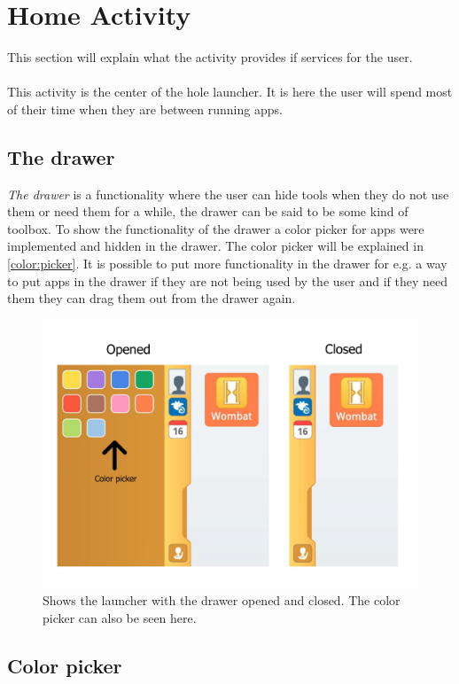 \section{Home Activity}
This section will explain what the activity  provides if services for the user.\\\\
This activity is the center of the hole launcher. It is here the user will spend most of their time when they are between running apps.

\subsection{The drawer}
\textit{The drawer} is a functionality where the user can hide tools when they do not use them or need them for a while, the drawer can be said to be some kind of toolbox. To show the functionality of the drawer a color picker for apps were implemented and hidden in the drawer. The color picker will be explained in \autoref{color:picker}.
It is possible to put more functionality in the drawer for e.g. a way to put apps in the drawer if they are not being used by the user and if they need them they can drag them out from the drawer again.

\begin{figure}[h!]
	\centering
	\includegraphics[scale=0.3]{gfx/home-activity}
	\caption{Shows the launcher with the drawer opened and closed. The color picker can also be seen here.}
	\label{fig:home-activity}
\end{figure}

\subsection{Color picker}\label{color:picker}

